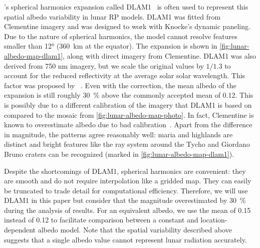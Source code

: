\citeauthor{Floberghagen1999}'s  spherical harmonics expansion called \gls{DLAM1}~\cite{Floberghagen1999} is often used to represent this spatial albedo variability in lunar \gls{RP} models. \gls{DLAM1} was fitted from Clementine imagery and was designed to work with Knocke's dynamic paneling. Due to the nature of spherical harmonics, the model cannot resolve features smaller than \ang{12} (\qty{360}{\km} at the equator). The expansion is shown in \cref{fig:lunar-albedo-map-dlam1}, along with direct imagery from Clementine. \gls{DLAM1} was also derived from 750 nm imagery, but we scale the original values by $1/1.3$ to account for the reduced reflectivity at the average solar solar wavelength. This factor was proposed by \citeauthor{Vasavada2012}~\cite{Vasavada2012}. Even with the correction, the mean albedo of the expansion is still roughly \qty{30}{\percent} above the commonly accepted mean of 0.12. This is possibly due to a different calibration of the imagery that \gls{DLAM1} is based on compared to the mosaic from \cref{fig:lunar-albedo-map-photo}. In fact, Clementine is known to overestimate albedo due to bad calibration~\cite{Shkuratov2011}. Apart from the difference in magnitude, the patterns agree reasonably well: maria and highlands are distinct and bright features like the ray system around the Tycho and Giordano Bruno craters can be recognized (marked in \cref{fig:lunar-albedo-map-dlam1}).

Despite the shortcomings of \gls{DLAM1}, spherical harmonics are convenient: they are smooth and do not require interpolation like a gridded map. They can easily be truncated to trade detail for computational efficiency. Therefore, we will use \gls{DLAM1} in this paper but consider that the magnitude overestimated by \qty{30}{\percent} during the analysis of results. For an equivalent albedo, we use the mean of 0.15 instead of 0.12 to facilitate comparison between a constant and location-dependent albedo model. Note that the spatial variability described above suggests that a single albedo value cannot represent lunar radiation accurately.

